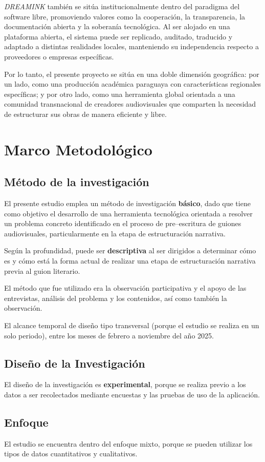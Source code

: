 \documentclass[12pt]{article}
\begin{document}
	\textit{DREAMINK} también se sitúa institucionalmente dentro del paradigma del software libre, promoviendo valores como la cooperación, la transparencia, la documentación abierta y la soberanía tecnológica. Al ser alojado en una plataforma abierta, el sistema puede ser replicado, auditado, traducido y adaptado a distintas realidades locales, manteniendo su independencia respecto a proveedores o empresas específicas.

	Por lo tanto, el presente proyecto se sitúa en una doble dimensión geográfica: por un lado, como una producción académica paraguaya con características regionales específicas; y por otro lado, como una herramienta global orientada a una comunidad transnacional de creadores audiovisuales que comparten la necesidad de estructurar sus obras de manera eficiente y libre.

	\section{Marco Metodológico}

	\subsection{M\'etodo de la investigaci\'on}

	El presente estudio emplea un m\'etodo de investigaci\'on \textbf{básico}, dado que tiene como objetivo el desarrollo de una herramienta tecnol\'ogica orientada a resolver un problema concreto identificado en el proceso de pre--escritura de guiones audiovisuales, particularmente en la etapa de estructuraci\'on narrativa.

	Según la profundidad, puede ser \textbf{descriptiva} al ser dirigidos a determinar cómo es y cómo está la forma actual de realizar una etapa de estructuraci\'on narrativa previa al guion literario.

	El método que fue utilizado era la observación participativa y el apoyo de las entrevistas, análisis del problema y los contenidos, así como también la observación.

	El alcance temporal de diseño tipo transversal (porque el estudio se realiza en un solo periodo), entre los meses de febrero a noviembre del año 2025.

	\subsection{Diseño de la Investigación}

	El diseño de la investigación es \textbf{experimental}, porque se realiza previo a los datos a ser recolectados mediante encuestas y las pruebas de uso de la aplicación.

	\subsection{Enfoque}

	El estudio se encuentra dentro del enfoque mixto, porque se pueden utilizar los tipos de datos cuantitativos y cualitativos.

	\printbibliography{}
\end{document}
